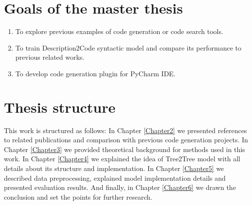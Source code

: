 \section{Goals of the master thesis}

\begin{enumerate}
	\item To explore previous examples of code generation or code search tools.
	\item To train Description2Code syntactic model and compare its performance to previous related works.
	\item To develop code generation plugin for PyCharm IDE.
\end{enumerate}

\section{Thesis structure}
This work is structured as follows: In Chapter \ref{Chapter2} we presented references to related publications and comparison with previous code generation projects. In Chapter \ref{Chapter3} we provided theoretical background for methods used in this work. In Chapter \ref{Chapter4} we explained the idea of Tree2Tree model with all details about its structure and implementation. In Chapter \ref{Chapter5} we described data preprocessing, explained model implementation details and presented evaluation results. And finally, in Chapter \ref{Chapter6} we drawn the conclusion and set the points for further research.